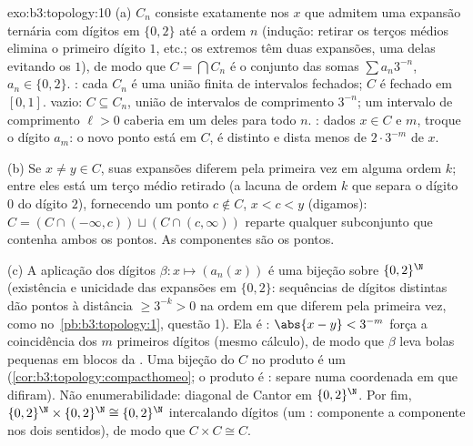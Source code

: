 \begin{solution}{exo:b3:topology:10}
(a) $C_n$ consiste exatamente nos $x$ que admitem uma expansão
ternária com dígitos em $\{0, 2\}$ até a ordem $n$ (indução:
retirar os terços médios elimina o primeiro dígito $1$, etc.; os extremos
têm duas expansões, uma delas evitando os $1$), de modo que $C = \bigcap C_n$
é o conjunto das somas $\sum a_n3^{-n}$, $a_n \in \{0,2\}$. :
cada $C_n$ é uma união finita de intervalos fechados; $C$ é fechado
em $[0,1]$.  vazio: $C \subseteq C_n$, união de
intervalos de comprimento $3^{-n}$; um intervalo  de comprimento
$\ell > 0$ caberia em um deles para todo $n$. : dados
$x \in C$ e $m$, troque o dígito $a_m$: o novo ponto está em
$C$, é distinto e dista menos de $2\cdot3^{-m}$ de $x$.

(b) Se $x \neq y \in C$, suas expansões diferem pela primeira vez em alguma
ordem $k$; entre eles está um terço médio retirado
(a lacuna de ordem $k$ que separa o dígito $0$ do dígito $2$),
fornecendo um ponto $c \notin C$, $x < c < y$ (digamos): $C =
(C \cap (-\infty, c)) \sqcup (C \cap (c, \infty))$ reparte qualquer
subconjunto que contenha ambos os pontos. As componentes são os pontos.

(c) A aplicação dos dígitos $\beta\colon x \mapsto (a_n(x))$ é uma
bijeção sobre $\{0,2\}^\N$ (existência e unicidade das
expansões em $\{0,2\}$: sequências de dígitos distintas dão pontos à
distância $\geq 3^{-k} > 0$ na ordem em que diferem pela primeira vez, como no~\cref{pb:b3:topology:1}, questão 1). Ela é :
$\abs{x - y} < 3^{-m}$ força a coincidência dos $m$ primeiros dígitos
(mesmo cálculo), de modo que $\beta$ leva bolas pequenas em blocos
da . Uma bijeção  do  $C$ no
produto  é um 
(\cref{cor:b3:topology:compacthomeo}; o produto é :
separe numa coordenada em que difiram). Não enumerabilidade: diagonal de
Cantor em $\{0,2\}^\N$. Por fim, $\{0,2\}^\N \times
\{0,2\}^\N \cong \{0,2\}^\N$ intercalando dígitos (um
:  componente a componente nos dois sentidos), de modo que $C
\times C \cong C$.
\end{solution}


